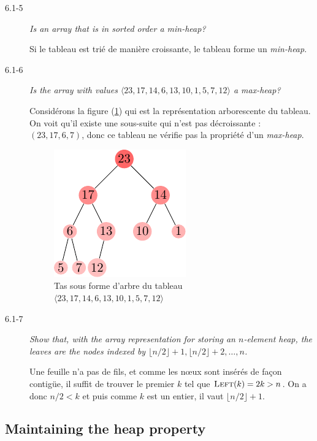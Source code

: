 \begin{description}
\begin{ex}
    \end{ex}
  \item[6.1-5] {\itshape Is an array that is in sorted order a min-heap?}
    \begin{ex} %
      Si le tableau est tri\'e de mani\`ere croissante, le tableau forme un {\itshape min-heap}.
    \end{ex}
  \item[6.1-6] {\itshape Is the array with values $\langle 23, 17, 14, 6, 13, 10, 1, 5, 7, 12\rangle$ a max-heap?}
    \begin{ex}
      Consid\'erons la figure (\ref{fig:6.1-6}) qui est la repr\'esentation arborescente du tableau. On voit qu'il existe une sous-suite qui n'est pas d\'ecroissante : $(23, 17, 6, 7)$, donc ce tableau ne v\'erifie pas la propri\'et\'e d'un \textit{max-heap}.
        \begin{figure}[H]
          \centering
        \includegraphics[scale=1.5]{img/6_1-6/6_1-6.pdf}
        \caption{Tas sous forme d'arbre du tableau $\langle 23, 17, 14, 6, 13, 10, 1, 5, 7, 12\rangle$}
          \label{fig:6.1-6}
        \end{figure}
    \end{ex}
  \item[6.1-7] {\itshape Show that, with the array representation for storing an $n$-element heap, the leaves are the nodes indexed by $\lfloor n/2 \rfloor +1, \lfloor n/2\rfloor + 2, \ldots, n$.}
    \begin{ex}
      Une feuille n'a pas de fils, et comme les n\oe ux sont ins\'er\'es de fa\c{c}on contig\"ue, il suffit de trouver le premier    $k$ tel que $\textsc{Left}(k) =2k > n$. On a donc $n/2 < k$ et puis comme $k$ est un entier, il vaut $\lfloor n/2 \rfloor +1$.
    \end{ex}
\end{description}

\subsection{Maintaining the heap property}


